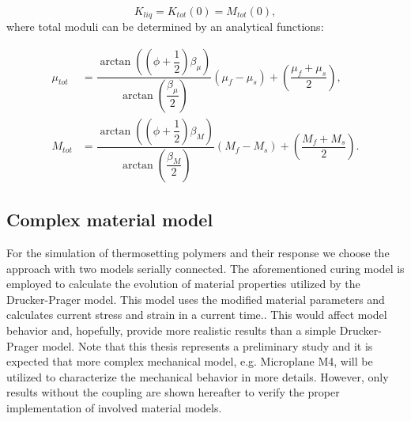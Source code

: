  \begin{equation}
 	K_{liq} = K_{tot}(0) = M_{tot}(0),
 \end{equation} 
 where total moduli can be determined by an analytical functions:
 
 \begin{align}
 	\mu_{tot} &= \dfrac{\arctan((\phi+\dfrac{1}{2})\beta_\mu)}{\arctan(\dfrac{\beta_\mu}{2})}(\mu_f-\mu_s)+\left( \dfrac{\mu_f + \mu_s}{2} \right),\\
 	M_{tot} &= \dfrac{\arctan((\phi+\dfrac{1}{2})\beta_M)}{\arctan(\dfrac{\beta_M}{2})}(M_f-M_s)+\left( \dfrac{M_f + M_s}{2} \right).
 \end{align}
 
 \subsection{Complex material model}
 \indent
 
 For the simulation of thermosetting polymers and their response we choose the approach with two models serially connected. The aforementioned curing model is employed to calculate the evolution of material properties utilized by the Drucker-Prager model. This model uses the modified material parameters and calculates current stress and strain in a current time.. This would affect model behavior and, hopefully, provide more realistic results than a simple Drucker-Prager model. Note that this thesis represents a preliminary study and it is expected that more complex mechanical model, e.g. Microplane M4, will be utilized to characterize the mechanical behavior in more details. However, only results without the coupling are shown hereafter to verify the proper implementation of involved material models.